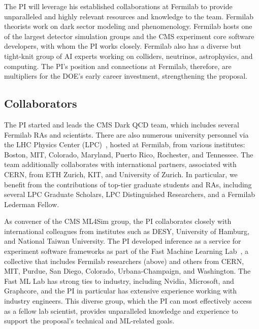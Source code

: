 The PI will leverage his established collaborations at Fermilab to provide unparalleled and highly relevant resources and knowledge to the team.
Fermilab theorists work on dark sector modeling and phenomenology.
Fermilab hosts one of the largest detector simulation groups and the CMS experiment core software developers, with whom the PI works closely.
Fermilab also has a diverse but tight-knit group of AI experts working on colliders, neutrinos, astrophysics, and computing.
The PI's position and connections at Fermilab, therefore, are multipliers for the DOE's early career investment, strengthening the proposal.

\subsection{Collaborators}\label{subsec:collab}

The PI started and leads the CMS Dark QCD team, which includes several Fermilab RAs and scientists.
There are also numerous university personnel via the LHC Physics Center (LPC)~\cite{LPC}, hosted at Fermilab, from various institutes:
Boston, MIT, Colorado, Maryland, Puerto Rico, Rochester, and Tennessee.
The team additionally collaborates with international partners, associated with CERN, from ETH Zurich, KIT, and University of Zurich.
In particular, we benefit from the contributions of top-tier graduate students and RAs, including several LPC Graduate Scholars, LPC Distinguished Researchers, and a Fermilab Lederman Fellow.

As convener of the CMS ML4Sim group, the PI collaborates closely with international colleagues from institutes such as DESY, University of Hamburg, and National Taiwan University.
The PI developed inference as a service for experiment software frameworks as part of the Fast Machine Learning Lab~\cite{FML},
a collective that includes Fermilab researchers (above)
and others from CERN, MIT, Purdue, San Diego, Colorado, Urbana-Champaign, and Washington.
The Fast ML Lab has strong ties to industry, including Nvidia, Microsoft, and Graphcore, and the PI in particular has extensive experience working with industry engineers.
This diverse group, which the PI can most effectively access as a fellow lab scientist,
provides unparalleled knowledge and experience to support the proposal's technical and ML-related goals.
